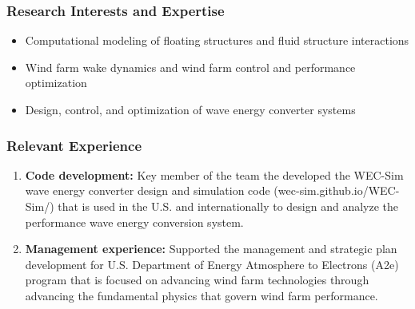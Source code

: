 \subsubsection*{\large{Research Interests and Expertise}}
\vspace{-0.15in}

\begin{itemize}  \itemsep1pt \parskip0pt 
\item Computational modeling of floating structures and fluid structure interactions
\item Wind farm wake dynamics and wind farm control and performance optimization
\item Design, control, and optimization of wave energy converter systems
\end{itemize}

\vspace{-0.2in}
\subsubsection*{Relevant Experience}
\vspace{-0.1in}
\begin{enumerate}[leftmargin=1.5pc,itemsep=2pt,parsep=0pt,topsep=0pt,partopsep=1pt]
\item \textbf{Code development:} Key member of the team the developed the WEC-Sim wave energy converter design and simulation code (wec-sim.github.io/WEC-Sim/) that is used in the U.S. and internationally to design and analyze the performance wave energy conversion system.
\item \textbf{Management experience:} Supported the management and strategic plan development for U.S. Department of Energy Atmosphere to Electrons (A2e) program that is focused on advancing wind farm technologies through advancing the fundamental physics that govern wind farm performance.
\end{enumerate}
